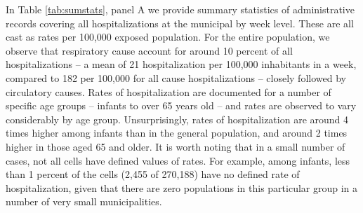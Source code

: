 \documentclass[11pt]{article}
\begin{document}
\begin{spacing}{1.5}

In Table \ref{tab:sumstats}, panel A we provide summary statistics of administrative records covering all hospitalizations at the municipal by week level. These are all cast as rates per 100,000 exposed population.  For the entire population, we observe that respiratory cause account for around 10 percent of all hospitalizations -- a mean of 21 hospitalization per 100,000 inhabitants in a week, compared to 182 per 100,000 for all cause hospitalizations -- closely followed by circulatory causes.  Rates of hospitalization are documented for a number of specific age groups -- infants to over 65 years old -- and rates are observed to vary considerably by age group.  Unsurprisingly, rates of hospitalization are around 4 times higher among infants than in the general population, and around 2 times higher in those aged 65 and older.  It is worth noting that in a small number of cases, not all cells have defined values of rates.  For example, among infants, less than 1 percent of the cells (2,455 of 270,188) have no defined rate of hospitalization, given that there are zero populations in this particular group in a number of very small municipalities.  %




\end{spacing}
\end{document}
